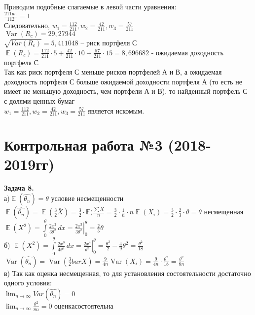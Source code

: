\documentclass[112pt, cmcyralt]{article}
\DeclareMathOperator{\Var}{Var}
\DeclareMathOperator{\E}{\mathbb{E}}
\def\be{\hangindent=14mm \hangafter=1 \noindent}
\begin{document}
Приводим подобные слагаемые в левой части уравнения:\\

$\frac{211w_1}{112}=1$\\

Следовательно, $w_1=\frac{112}{211}, w_2=\frac{42}{211}, w_3=\frac{57}{211}$\\

$\Var(R_c)=29,27944$\\

$\sqrt{Var(R_c)} = 5,411048$ – риск портфеля С\\

$\E(R_c) = \frac{112}{211}\cdot5 + \frac{42}{211}\cdot10 + \frac{57}{211}\cdot15 = 8,696682$ - ожидаемая доходность портфеля С\\

Так как риск портфеля С меньше рисков портфелей А и В, а ожидаемая доходность портфеля С больше ожидаемой доходности портфеля А (то есть не имеет не меньшую доходность, чем портфели А и В), то найденный портфель С с долями ценных бумаг \\

$w_1=\frac{112}{211} ,w_2=\frac{42}{211}, w_3= \frac{57}{211}$ является искомым.


\section{Контрольная работа №3 (2018-2019гг)}
\be \textbf{Задача 8.} \\
а)$\E(\hat{\theta_n})=\theta$ условие несмещенности\\

$\E(\hat{\theta_n})=\E(\frac{3}{2}\bar{X})=\frac{3}{2}\cdot\mathbb{E}(\frac{\sum X}{n}=\frac{3}{2}\cdot\frac{1}{n}\cdot n\E(X_i)=\frac{3}{2}\cdot\frac{2}{3}\cdot\theta=\theta$ \Rightarrow $несмещенная$\\
$\E(X^2)=\int\limits_{0}^{\theta} \frac{2x^2}{3\theta^2} \,dx = \left.\frac{2x^3}{3\theta^2}\right|_0^\theta = \frac{2}{3}\theta$\\
б) $\E(X^2)=\int\limits_{0}^{\theta} \frac{2x^3}{4\theta^2}\, dx = \left.\frac{2x^4}{\theta^2}\right|_0^\theta=\frac{\theta^2}{2}-\frac{4}{9}\theta^2=\frac{\theta^2}{18}$\\
$\Var(\hat{\theta_n}) = \Var(\frac{3}{2}bar{X})=\frac{9}{4n}\Var(X_i)=\frac{9}{4n}\cdot\frac{\theta^2}{18}=\frac{\theta^2}{8n}$\\

в) Так как оценка несмещенная, то для установления состоятельности достаточно одного условия:\\
$\lim_{n\to\infty}Var(\hat{\theta_n})=0$\\
$\lim_{n\to\infty}\frac{\theta^2}{8n}=0$ \Rightarrow $оценка состоятельна$\\
\end{document}
